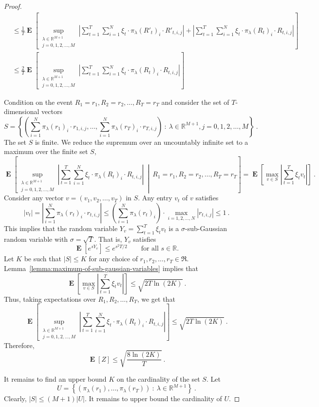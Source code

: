 \documentclass[12pt]{article}
\newcommand{\R}{\mathbb{R}}
\newcommand{\Requests}{\mathfrak{R}}
\DeclareMathOperator*{\Exp}{\mathbf{E}}
\theoremstyle{definition}
\begin{document}
\begin{proof}
\begin{align*}
& \le \frac{1}{T} \Exp\left[\sup_{\substack{\lambda \in \R^{M+1} \\ j=0,1,2,\dots,M}} \left| \sum_{t=1}^T \sum_{i=1}^N \xi_t \cdot \pi_\lambda(R'_t)_i \cdot R'_{t,i,j} \right| + \left| \sum_{t=1}^T \sum_{i=1}^N \xi_t \cdot \pi_\lambda(R_t)_i \cdot R_{t,i,j} \right|  \right] \\
& \le \frac{2}{T} \Exp\left[\sup_{\substack{\lambda \in \R^{M+1} \\ j=0,1,2,\dots,M}} \left| \sum_{t=1}^T \sum_{i=1}^N \xi_t \cdot \pi_\lambda(R_t)_i \cdot R_{t,i,j}  \right| \right]
\end{align*}

Condition on the event $R_1=r_1, R_2=r_2, \dots, R_T=r_T$ and consider the set of $T$-dimensional vectors
$$
S = \left\{ \left(\sum_{i=1}^N \pi_\lambda(r_1)_i \cdot r_{1,i,j}, \dots, \sum_{i=1}^N \pi_\lambda(r_T)_i \cdot r_{T,i,j} \right) ~:~ \lambda \in \R^{M+1}, j=0,1,2,\dots,M \right\} \: .
$$
The set $S$ is finite. We reduce the supremum over an uncountably infinite set to a maximum over the finite set $S$,
$$
\Exp\left[\sup_{\substack{\lambda \in \R^{M+1} \\ j=0,1,2,\dots,M}} \left| \sum_{t=1}^T \sum_{i=1}^N \xi_t \cdot \pi_\lambda(R_t)_i \cdot R_{t,i,j}  \right| ~\middle|~ R_1=r_1, R_2=r_2, \dots, R_T=r_T \right]
= \Exp\left[\max_{v \in S} \left| \sum_{t=1}^T \xi_t v_t \right| \right]  \: .
$$
Consider any vector $v = (v_1, v_2, \dots, v_T)$ in $S$. Any entry $v_t$ of $v$ satisfies
$$
|v_t| = \left|\sum_{i=1}^N \pi_\lambda(r_t)_i \cdot r_{t,i,j}\right| \le \left(\sum_{i=1}^N \pi_\lambda(r_t)_i\right) \cdot  \max_{i=1,2,\dots,N} |r_{t,i,j}| \le 1 \: .
$$
This implies that the random variable $Y_v = \sum_{t=1}^T \xi_t v_t$ is a
$\sigma$-sub-Gaussian random variable with $\sigma=\sqrt{T}$. That is, $Y_v$
satisfies
$$
\Exp[e^{sY_v}] \le e^{s^2T/2} \qquad \text{for all $s \in \R$.}
$$
Let $K$ be such that $|S| \le K$ for any choice of $r_1, r_2, \dots, r_T \in
\Requests$. Lemma~\ref{lemma:maximum-of-sub-gaussian-variables} implies that
$$
\Exp\left[\max_{v \in S} \left| \sum_{t=1}^T \xi_t v_t \right| \right] \le \sqrt{2T \ln(2K)} \: .
$$
Thus, taking expectations over $R_1, R_2, \dots, R_T$, we get that
$$
\Exp\left[\sup_{\substack{\lambda \in \R^{M+1} \\ j=0,1,2,\dots,M}}  \left| \sum_{t=1}^T \sum_{i=1}^N \xi_t \cdot \pi_\lambda(R_t)_i \cdot R_{t,i,j}  \right|  \right] \le \sqrt{2T \ln(2K)} \: .
$$
Therefore,
$$
\Exp[Z] \le \sqrt{\frac{8 \ln(2K)}{T}} \: .
$$

It remains to find an upper bound $K$ on the cardinality of the set $S$. Let
$$
U = \left\{ \left(\pi_\lambda(r_1), \dots, \pi_\lambda(r_T) \right) ~:~ \lambda \in \R^{M+1} \right\} \: .
$$
Clearly, $|S| \le (M+1) |U|$. It remains to upper bound the cardinality of $U$.


\end{proof}
\end{document}
